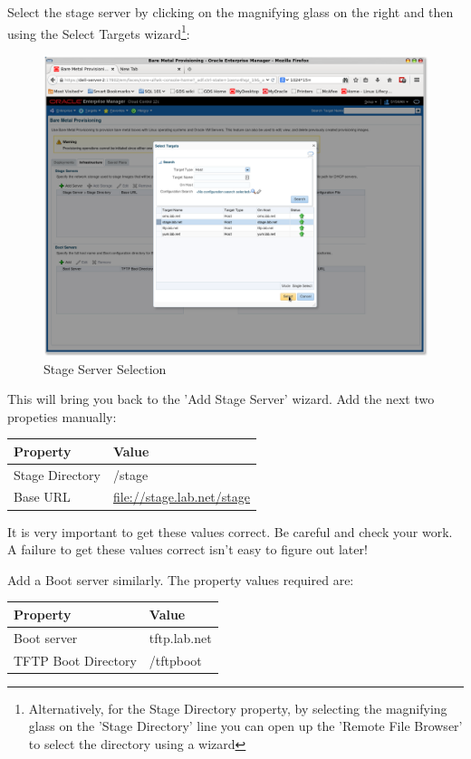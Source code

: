 \documentclass[11pt]{article}
\begin{document}
Select the stage server by clicking on the magnifying glass on the right and then using the Select Targets wizard\footnote{Alternatively, for the Stage Directory property, by selecting the magnifying glass on the 'Stage Directory' line you can open up the 'Remote File Browser' to select the directory using a wizard}:
\begin{figure}[htb]
\centering
\includegraphics[width=.9\linewidth]{./images/Stage_server_selection.png}
\caption{Stage Server Selection}
\end{figure}
\clearpage

This will bring you back to the 'Add Stage Server' wizard. Add the next two propeties manually:

\begin{center}
\begin{tabular}{ll}
Property & Value\\
\hline
Stage Directory & /stage\\
Base URL & \url{file://stage.lab.net/stage}\\
\end{tabular}
\end{center}

It is very important to get these values correct. Be careful and check your work. A failure to get these values correct isn't easy to figure out later!

Add a Boot server similarly. The property values required are:

\begin{center}
\begin{tabular}{ll}
Property & Value\\
\hline
Boot server & tftp.lab.net\\
TFTP Boot Directory & /tftpboot\\
\end{tabular}
\end{center}
\end{document}
